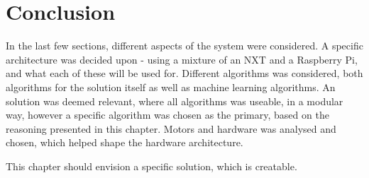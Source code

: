 \section{Conclusion}
In the last few sections, different aspects of the system were considered.
A specific architecture was decided upon - using a mixture of an NXT and a Raspberry Pi, and what each of these will be used for.
Different algorithms was considered, both algorithms for the solution itself as well as machine learning algorithms.
An solution was deemed relevant, where all algorithms was useable, in a modular way, however a specific algorithm was chosen as the primary, based on the reasoning presented in this chapter.
Motors and hardware was analysed and chosen, which helped shape the hardware architecture.


This chapter should envision a specific solution, which is creatable. 
